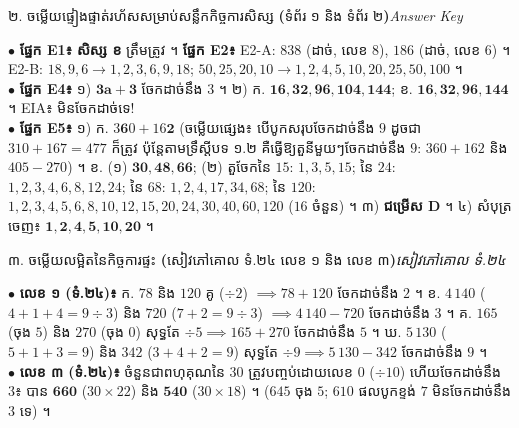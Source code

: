 \documentclass[a4paper,10pt]{article}
\newcommand{\en}[1]{{\TimesEn #1}}
\newcommand{\enbf}[1]{{\TimesEn\bfseries #1}}
\newcommand{\secstrip}[2]{%
  \vspace{3pt}%
  \begin{tcolorbox}[
    enhanced, sharp corners, colback=panelgray, colframe=black,
    boxrule=0.8pt, boxsep=0.8pt, top=2pt, bottom=2pt, left=5pt, right=5pt,
    after skip=3pt
  ]
    {\muol\fontsize{8.5pt}{12.2pt}\selectfont #1}\hfill{\fontsize{7.8pt}{10.8pt}\selectfont\textit{#2}}
  \end{tcolorbox}%
}
\begin{document}
\vfill
\secstrip{២. ចម្លើយផ្ទៀងផ្ទាត់រហ័សសម្រាប់សន្លឹកកិច្ចការសិស្ស \enbf{(}ទំព័រ ១ និង ទំព័រ ២\enbf{)}}{\en{Answer Key}}

\begin{tcolorbox}[
  enhanced, sharp corners, colback=white, colframe=black,
  boxrule=0.8pt, boxsep=2.5pt, top=4pt, bottom=4pt, left=6pt, right=6pt
]
  \fontsize{8.8pt}{13.0pt}\selectfont
  $\bullet$ \textbf{ផ្នែក \en{E1}៖} \textbf{សិស្ស ខ} ត្រឹមត្រូវ ។ \textbf{ផ្នែក \en{E2}៖} \en{E2-A}: $838$ (ដាច់, លេខ $8$), $186$ (ដាច់, លេខ $6$) ។ \en{E2-B}: $18, 9, 6 \to 1,2,3,6,9,18$; $50, 25, 20, 10 \to 1,2,4,5,10,20,25,50,100$ ។\\[2pt]
  $\bullet$ \textbf{ផ្នែក \en{E4}៖} ១) $\mathbf{3a+3}$ ចែកដាច់នឹង $3$ ។ ២) ក. $\mathbf{16, 32, 96, 104, 144}$; ខ. $\mathbf{16, 32, 96, 144}$ ។ \en{EIA}៖ មិនចែកដាច់ទេ!\\[2pt]
  $\bullet$ \textbf{ផ្នែក \en{E5}៖} ១) ក. $3\mathbf{6}0 + 16\mathbf{2}$ (ចម្លើយផ្សេង៖ បើបូកសរុបចែកដាច់នឹង $9$ ដូចជា $310+167=477$ ក៏ត្រូវ ប៉ុន្តែតាមទ្រឹស្ដីបទ ១.២ គឺធ្វើឱ្យតួនីមួយៗចែកដាច់នឹង $9$: $360+162$ និង $405-270$) ។ ខ. (១) $\mathbf{30, 48, 66}$; (២) តួចែកនៃ $15$: $1,3,5,15$; នៃ $24$: $1,2,3,4,6,8,12,24$; នៃ $68$: $1,2,4,17,34,68$; នៃ $120$: $1,2,3,4,5,6,8,10,12,15,20,24,30,40,60,120$ ($16$ ចំនួន) ។ ៣) \textbf{ជម្រើស \en{D}} ។ ៤) សំបុត្រចេញ៖ $\mathbf{1,2,4,5,10,20}$ ។
\end{tcolorbox}

\vfill
\secstrip{៣. ចម្លើយលម្អិតនៃកិច្ចការផ្ទះ \enbf{(}សៀវភៅគោល ទំ.២៤ លេខ ១ និង លេខ ៣\enbf{)}}{សៀវភៅគោល ទំ.២៤}

\begin{tcolorbox}[
  enhanced, sharp corners, colback=white, colframe=black,
  boxrule=0.8pt, boxsep=2.5pt, top=4pt, bottom=4pt, left=6pt, right=6pt
]
  \fontsize{8.7pt}{12.8pt}\selectfont
  $\bullet$ \textbf{លេខ ១ (ទំ.២៤)៖} ក. $78$ និង $120$ គូ ($\div 2$) $\implies 78+120$ ចែកដាច់នឹង $2$ ។ ខ. $4\,140$ ($4+1+4=9\div 3$) និង $720$ ($7+2=9\div 3$) $\implies 4\,140-720$ ចែកដាច់នឹង $3$ ។ គ. $165$ (ចុង $5$) និង $270$ (ចុង $0$) សុទ្ធតែ $\div 5 \implies 165+270$ ចែកដាច់នឹង $5$ ។ ឃ. $5\,130$ ($5+1+3=9$) និង $342$ ($3+4+2=9$) សុទ្ធតែ $\div 9 \implies 5\,130-342$ ចែកដាច់នឹង $9$ ។\\[2pt]
  $\bullet$ \textbf{លេខ ៣ (ទំ.២៤)៖} ចំនួនជាពហុគុណនៃ $30$ ត្រូវបញ្ចប់ដោយលេខ $0$ ($\div 10$) ហើយចែកដាច់នឹង $3$៖ បាន $\mathbf{660}$ ($30\times 22$) និង $\mathbf{540}$ ($30\times 18$) ។ ($645$ ចុង $5$; $610$ ផលបូកខ្ទង់ $7$ មិនចែកដាច់នឹង $3$ ទេ) ។
\end{tcolorbox}
\end{document}
